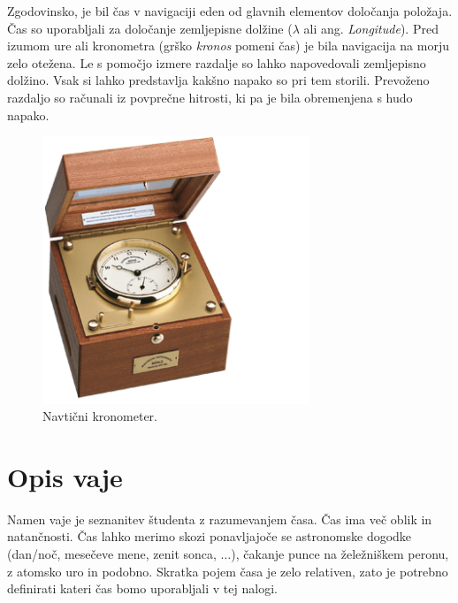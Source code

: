 \documentclass[11pt]{article}
\begin{document}

Zgodovinsko, je bil čas v navigaciji eden od glavnih elementov določanja položaja. Čas so uporabljali za določanje zemljepisne dolžine ($\lambda$ ali ang. \emph{Longitude}). Pred izumom ure ali  kronometra (grško \emph{kronos} pomeni čas) je bila navigacija na morju zelo otežena. Le s pomočjo izmere razdalje so lahko napovedovali zemljepisno dolžino. Vsak si lahko predstavlja kakšno napako so pri tem storili. Prevoženo razdaljo so računali iz povprečne hitrosti, ki pa je bila obremenjena s hudo napako.

\begin{figure}[!h]
	\centering \includegraphics[width=8cm]{figs/kronometer_01.png}
	\caption{Navtični kronometer.}
\end{figure}

\section{Opis vaje}
\label{sec:v_cas_opis}
Namen vaje je seznanitev študenta z razumevanjem časa. Čas ima več oblik in natančnosti. Čas lahko merimo skozi ponavljajoče se astronomske dogodke (dan/noč, mesečeve mene, zenit sonca, $\ldots$), čakanje punce na želežniškem peronu, z atomsko uro in podobno. Skratka pojem časa je zelo relativen, zato je potrebno definirati kateri čas bomo uporabljali v tej nalogi.
\end{document}
